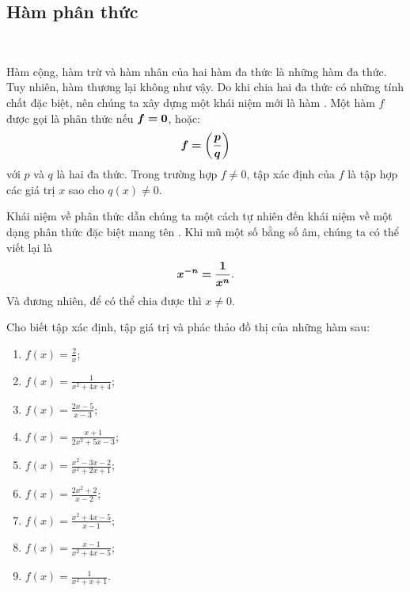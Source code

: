 \subsection{Hàm phân thức}

\ %

Hàm cộng, hàm trừ và hàm nhân của hai hàm đa thức là những hàm đa thức. Tuy nhiên, hàm thương lại không như vậy. Do khi chia hai đa thức có những tính chất đặc biệt, nên chúng ta xây dựng một khái niệm mới là hàm . Một hàm $f$ được gọi là phân thức nếu $\bm{f = 0}$, hoặc: $$\bm{f = \left(\frac{p}{q}\right)}$$ với $p$ và $q$ là hai đa thức. Trong trường hợp $f \neq 0$, tập xác định của $f$ là tập hợp các giá trị $x$ sao cho $q(x) \neq 0$. 

Khái niệm về phân thức dẫn chúng ta một cách tự nhiên đến khái niệm về một dạng phân thức đặc biệt mang tên . Khi mũ một số bằng số âm, chúng ta có thể viết lại là $$\bm{x^{-n} = \frac{1}{x^n}}.$$ Và đương nhiên, để có thể chia được thì $x \neq 0$.

\exercise Cho biết tập xác định, tập giá trị và phác thảo đồ thị của những hàm sau:
\begin{multicols}{3}
   \begin{enumerate}
      \item $\displaystyle f(x) = \frac{2}{x}$;
      \item $\displaystyle f(x) = \frac{1}{x^2 + 4x + 4}$;
      \item $\displaystyle f(x) = \frac{2x - 5}{x - 3}$;
      \item $\displaystyle f(x) = \frac{x + 1}{2x^2 + 5x - 3}$;
      \item $\displaystyle f(x) = \frac{x^2 - 3x - 2}{x^2 + 2x + 1}$;
      \item $\displaystyle f(x) = \frac{2x^2 + 2}{x - 2}$;
      \item $\displaystyle f(x) = \frac{x^2 + 4x - 5}{x - 1}$;
      \item $\displaystyle f(x) = \frac{x - 1}{x^2 + 4x - 5}$;
      \item $\displaystyle f(x) = \frac{1}{x^2 + x + 1}$.
   \end{enumerate}
\end{multicols}

\solution

